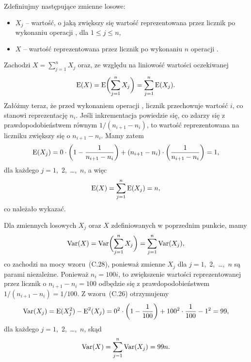 
\subexercise{} %
Zdefiniujmy następujące zmienne losowe:
\begin{itemize}
	\item $X_j$ -- wartość, o jaką zwiększy się wartość reprezentowana przez licznik po  wykonaniu operacji , dla $1\le j\le n$,
	\item $X$ -- wartość reprezentowana przez licznik po wykonaniu $n$ operacji .
\end{itemize}
Zachodzi $X=\sum_{j=1}^nX_j$ oraz, ze względu na liniowość wartości oczekiwanej
\[
	\operatorname{E}(X) = \operatorname{E}\biggl(\sum_{j=1}^nX_j\biggr) = \sum_{j=1}^n\operatorname{E}(X_j).
\]
Załóżmy teraz, że przed wykonaniem  operacji , licznik przechowuje wartość $i$, co stanowi reprezentację $n_i$. Jeśli inkrementacja powiedzie się, co zdarzy się z prawdopodobieństwem równym $1/(n_{i+1}-n_i)$, to wartość reprezentowana na liczniku zwiększy się o $n_{i+1}-n_i$. Mamy zatem
\[
	\operatorname{E}(X_j) = 0\cdot\left(1-\frac{1}{n_{i+1}-n_i}\right)+(n_{i+1}-n_i)\cdot\left(\frac{1}{n_{i+1}-n_i}\right) = 1,
\]
dla każdego $j=1$,~2,~\dots,~$n$, a więc
\[
	\operatorname{E}(X) = \sum_{j=1}^n\operatorname{E}(X_j) = n,
\]
co należało wykazać.

\subexercise{} %
Dla zmiennych losowych $X_j$ oraz $X$ zdefiniowanych w poprzednim punkcie, mamy
\[
	\operatorname{Var}(X) = \operatorname{Var}\biggl(\sum_{j=1}^nX_j\biggr) = \sum_{j=1}^n\operatorname{Var}(X_j),
\]
co zachodzi na mocy wzoru~(C.28), ponieważ zmienne $X_j$ dla $j=1$,~2,~\dots,~$n$ są parami niezależne. Ponieważ $n_i=100i$, to zwiększenie wartości reprezentowanej przez licznik o $n_{i+1}-n_i=100$ odbędzie się z prawdopodobieństwem $1/(n_{i+1}-n_i)=1/100$. Z wzoru~(C.26) otrzymujemy
\[
	\operatorname{Var}(X_j) = \operatorname{E}(X_j^2)-\operatorname{E}^2(X_j) = 0^2\cdot\left(1-\frac{1}{100}\right)+100^2\cdot\frac{1}{100}-1^2 = 99,
\]
dla każdego $j=1$,~2,~\dots,~$n$, skąd
\[
	\operatorname{Var}(X) = \sum_{j=1}^n\operatorname{Var}(X_j) = 99n.
\]


